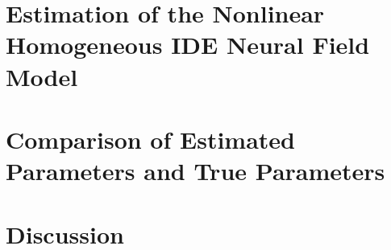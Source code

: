 \documentclass[onecolumn,draftcls]{IEEEtran}
\begin{document}
% 
\section{Estimation of the Nonlinear Homogeneous IDE Neural Field Model}


\section{Comparison of Estimated Parameters and True Parameters}

\section{Discussion}

%
%
\end{document}
